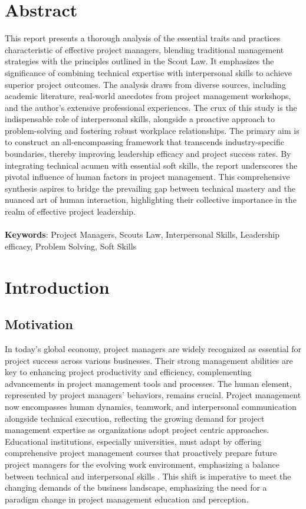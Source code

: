 \documentclass{article}
\begin{document}
\section{Abstract}
This report presents a thorough analysis of the essential traits and practices characteristic of effective project managers, blending traditional management strategies with the principles outlined in the Scout Law. It emphasizes the significance of combining technical expertise with interpersonal skills to achieve superior project outcomes. The analysis draws from diverse sources, including academic literature, real-world anecdotes from project management workshops, and the author's extensive professional experiences. The crux of this study is the indispensable role of interpersonal skills, alongside a proactive approach to problem-solving and fostering robust workplace relationships. The primary aim is to construct an all-encompassing framework that transcends industry-specific boundaries, thereby improving leadership efficacy and project success rates. By integrating technical acumen with essential soft skills, the report underscores the pivotal influence of human factors in project management. This comprehensive synthesis aspires to bridge the prevailing gap between technical mastery and the nuanced art of human interaction, highlighting their collective importance in the realm of effective project leadership.
\\ \\
\textbf{Keywords}: Project Managers, Scouts Law, Interpersonal Skills, Leadership efficacy, Problem Solving, Soft Skills

\newpage

\section{Introduction}
\subsection{Motivation}
In today's global economy, project managers are widely recognized as essential for project success across various businesses. Their strong management abilities are key to enhancing project productivity and efficiency, complementing advancements in project management tools and processes. The human element, represented by project managers' behaviors, remains crucial. Project management now encompasses human dynamics, teamwork, and interpersonal communication alongside technical execution, reflecting the growing demand for project management expertise as organizations adopt project centric approaches. Educational institutions, especially universities, must adapt by offering comprehensive project management courses that proactively prepare future project managers for the evolving work environment, emphasizing a balance between technical and interpersonal skills \cite{pant2008project}. This shift is imperative to meet the changing demands of the business landscape, emphasizing the need for a paradigm change in project management education and perception.
\end{document}
